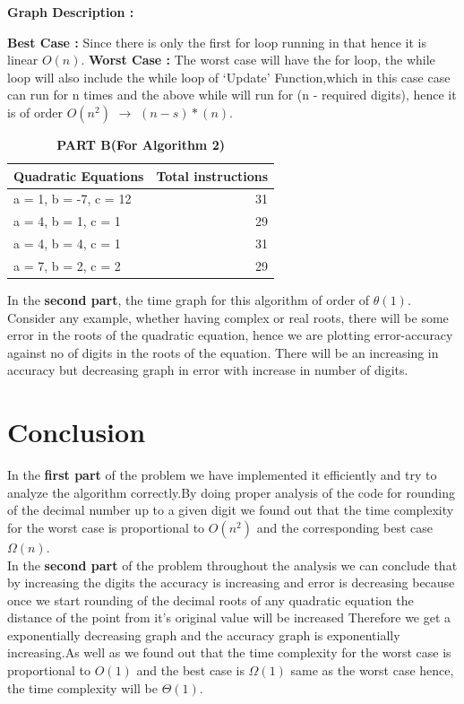 \documentclass[conference]{IEEEtran}
\begin{document}
\textbf {Graph Description :}

\textbf {Best Case :} Since there is only the first for loop running in that hence it is linear $O(n)$.
\textbf {Worst Case :} The worst case will have the for loop, the while loop will also include the while loop of ‘Update’ Function,which in this case case can run for n times and the above while will run for (n - required digits), hence it is of order $O(n^2)$ $\rightarrow$ $(n-s)*(n)$. 
\begin{table}[H]
\begin{center}
\caption{\textbf{PART B(For Algorithm 2)}}
	\label{tab:table2}
    \begin{tabular}{|l|r|}
    \hline
    \textbf{Quadratic Equations} & \textbf{Total instructions}\\
    \hline
    a = 1, b = -7, c = 12 & 31\\
    \hline
    a = 4, b = 1, c = 1 & 29 \\
	\hline
    a = 4, b = 4, c = 1 & 31\\
	\hline
    a = 7, b = 2, c = 2 & 29\\
	\hline
    \end{tabular}
\end{center}
\end{table}
In the \textbf{second part},%
the time graph %
for this algorithm of order of $\theta(1)$.%
Consider any example, whether having complex or real roots, there will be some error in the roots of the quadratic equation, hence we are plotting error-accuracy against no of digits in the roots of the equation. %
There will be an increasing in accuracy but decreasing graph in error with increase in number of digits. 

\section{Conclusion}
In the \textbf{first part} of the problem we have implemented it efficiently and try to analyze the algorithm correctly.By doing proper analysis of the code for rounding of the decimal number up to a given digit we found out that the time complexity for the worst case is proportional to $O (n^2)$ and the corresponding best case $\Omega(n)$.\\
In the \textbf{second part} of the problem throughout the analysis we can conclude that by increasing the digits the accuracy is increasing and error is decreasing because once we start rounding of the decimal roots of any quadratic equation the distance of the point from it's original value will be increased %
Therefore we get a exponentially decreasing graph and the  accuracy graph is exponentially increasing.As well as we found out that the time complexity for the worst case is proportional to $O(1)$ and the best case is $\Omega(1)$ same as the worst case hence, the time complexity will be $\Theta(1)$.
\end{document}
